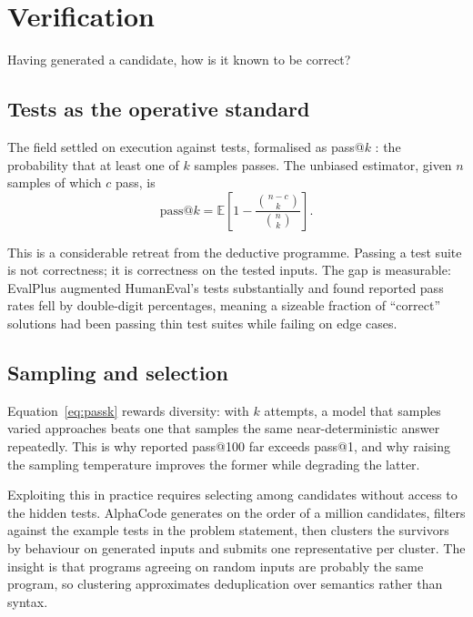 \documentclass[11pt,a4paper]{article}
\begin{document}
\section{Verification}
\label{sec:verification}

Having generated a candidate, how is it known to be correct?

\subsection{Tests as the operative standard}

The field settled on execution against tests, formalised as pass@$k$
\cite{chen2021}: the probability that at least one of $k$ samples passes. The
unbiased estimator, given $n$ samples of which $c$ pass, is
\begin{equation}
  \mathrm{pass}@k = \mathbb{E}\left[
    1 - \frac{\binom{n - c}{k}}{\binom{n}{k}} \right].
  \label{eq:passk}
\end{equation}

This is a considerable retreat from the deductive programme. Passing a test
suite is not correctness; it is correctness on the tested inputs. The gap is
measurable: EvalPlus \cite{liu2023} augmented HumanEval's tests substantially
and found reported pass rates fell by double-digit percentages, meaning a
sizeable fraction of ``correct'' solutions had been passing thin test suites
while failing on edge cases.

\subsection{Sampling and selection}

Equation~\ref{eq:passk} rewards diversity: with $k$ attempts, a model that
samples varied approaches beats one that samples the same near-deterministic
answer repeatedly. This is why reported pass@100 far exceeds pass@1, and why
raising the sampling temperature improves the former while degrading the
latter.

Exploiting this in practice requires selecting among candidates without access
to the hidden tests. AlphaCode \cite{li2022} generates on the order of a
million candidates, filters against the example tests in the problem
statement, then clusters the survivors by behaviour on generated inputs and
submits one representative per cluster. The insight is that programs agreeing
on random inputs are probably the same program, so clustering approximates
deduplication over semantics rather than syntax.
\end{document}
